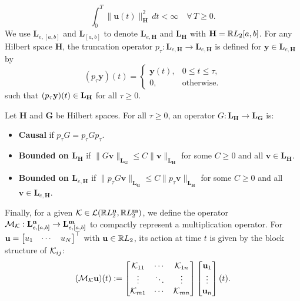 \[
	\int_0^T \|\mathbf{u}(t)\|_{\mathbf{H}}^2\, dt < \infty
	\quad \forall\, T \ge 0.
\] We use $\mathbf{L}_{e,[a,b]}$ and $\mathbf{L}_{[a,b]}$ to denote $\mathbf{L}_{e,\mathbf{H}}$ and $\mathbf{L}_{\mathbf{H}}$ with $\mathbf{H} = \mathbb{R} L_2[a,b]$. For any Hilbert space $\mathbf{H}$, the truncation operator $p_\tau : \mathbf{L}_{e,\mathbf{H}} \to \mathbf{L}_{e,\mathbf{H}}$ is defined for $\mathbf{y} \in \mathbf{L}_{e,\mathbf{H}}$ by
\begin{equation*}
	(p_\tau \mathbf{y})(t) =
	\begin{cases}
		\mathbf{y}(t), & 0 \le t \le \tau, \\
		0,             & \text{otherwise}.
	\end{cases}
\end{equation*}
such that $(p_\tau \mathbf{y})(t) \in \mathbf{L}_\mathbf{H}$ for all $\tau \ge 0$.
\begin{definition}
	Let $\mathbf{H}$ and $\mathbf{G}$ be Hilbert spaces. For all $\tau\geq0$, an operator $G : \mathbf{L}_{\mathbf{H}} \to \mathbf{L}_{\mathbf{G}}$ is:
	\begin{itemize}
		\item \textbf{Causal} if $p_\tau G = p_\tau G p_\tau$.
		\item \textbf{Bounded on $\mathbf{L}_{\mathbf{H}}$} if $\|G \mathbf{v}\|_{\mathbf{L}_{\mathbf{G}}} \le C \|\mathbf{v}\|_{\mathbf{L}_{\mathbf{H}}}$ for some $C \ge 0$ and all $\mathbf{v} \in \mathbf{L}_{\mathbf{H}}$.
		\item \textbf{Bounded on $\mathbf{L}_{e,\mathbf{H}}$} if $\|p_\tau G \mathbf{v}\|_{\mathbf{L}_{\mathbf{G}}} \le C \|p_\tau\mathbf{v}\|_{\mathbf{L}_{\mathbf{H}}}$ for some $C \ge 0$ and all $\mathbf{v} \in \mathbf{L}_{e,\mathbf{H}}$.
	\end{itemize}
\end{definition}
Finally, for a given $\mathcal{K} \in \mathcal{L}(\mathbb{R} L_2^{\mathbf{n}}, \mathbb{R} L_2^{\mathbf{m}})$, we define the operator $\mathcal{M}_{\mathcal{K}} : \mathbf{L}_{e,[a,b]}^{\mathbf{n}} \to \mathbf{L}_{e,[a,b]}^{\mathbf{m}}$ to compactly represent a multiplication operator. For $\mathbf{u} = \begin{bmatrix}u_1 & \cdots & u_N\end{bmatrix}^\top$ with $\mathbf{u} \in \mathbb{R} L_2$, its action at time $t$ is given by the block structure of $\mathcal{K}_{ij}$:
\begin{equation}
	\label{eq:block_operator_def}
	(\mathcal{M}_{\mathcal{K}} \mathbf{u})(t)
	:= \begin{bmatrix}
		\mathcal{K}_{11} & \cdots & \mathcal{K}_{1n} \\
		\vdots      & \ddots & \vdots      \\
		\mathcal{K}_{m1} & \cdots & \mathcal{K}_{mn}
	\end{bmatrix}
	\begin{bmatrix}\mathbf{u}_1 \\ \vdots \\ \mathbf{u}_n\end{bmatrix}(t).
\end{equation}

